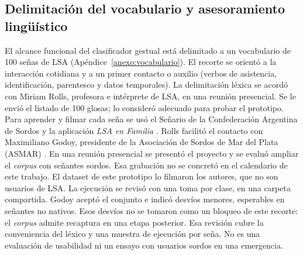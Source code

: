 \subsection{Delimitación del vocabulario y asesoramiento lingüístico}
El alcance funcional del clasificador gestual está delimitado a un vocabulario de 100 señas de LSA (Apéndice~\ref{anexo:vocabulario}). El recorte se orientó a la interacción cotidiana y a un primer contacto o auxilio (verbos de asistencia, identificación, parentesco y datos temporales). La delimitación léxica se acordó con Miriam Rolls, profesora e intérprete de LSA, en una reunión presencial. Se le envió el listado de 100 glosas; lo consideró adecuado para probar el prototipo. Para aprender y filmar cada seña se usó el Señario de la Confederación Argentina de Sordos \parencite{cas2024senario} y la aplicación \textit{LSA en Familia} \parencite{dane2024lsaenfamilia}.
Rolls facilitó el contacto con Maximiliano Godoy, presidente de la Asociación de Sordos de Mar del Plata (ASMAR) \parencite{asmar2024}. En una reunión presencial se presentó el proyecto y se evaluó ampliar el \textit{corpus} con señantes sordos. Esa grabación no se concretó en el calendario de este trabajo. El dataset de este prototipo lo filmaron los autores, que no son usuarios de LSA.
La ejecución se revisó con una toma por clase, en una carpeta compartida. Godoy aceptó el conjunto e indicó desvíos menores, esperables en señantes no nativos. Esos desvíos no se tomaron como un bloqueo de este recorte: el \textit{corpus} admite recaptura en una etapa posterior.
Esa revisión cubre la conveniencia del léxico y una muestra de ejecución por seña. No es una evaluación de usabilidad ni un ensayo con usuarios sordos en una emergencia.

